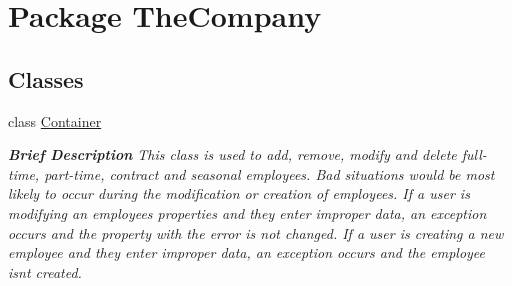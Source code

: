 \hypertarget{namespace_the_company}{}\section{Package The\+Company}
\label{namespace_the_company}
\subsection*{Classes}
\begin{DoxyCompactItemize}
\item 
class \hyperlink{class_the_company_1_1_container}{Container}
\begin{DoxyCompactList}\small\item\em {\bfseries Brief Description} This class is used to add, remove, modify and delete full-\/time, part-\/time, contract and seasonal employees. Bad situations would be most likely to occur during the modification or creation of employees. If a user is modifying an employee\textquotesingle{}s properties and they enter improper data, an exception occurs and the property with the error is not changed. If a user is creating a new employee and they enter improper data, an exception occurs and the employee isn\textquotesingle{}t created. \end{DoxyCompactList}\end{DoxyCompactItemize}
